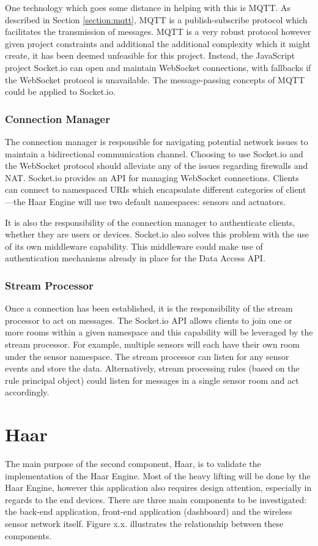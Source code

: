       One technology which goes some distance in helping with this is MQTT. As described in Section \ref{section:mqtt}, MQTT is a publish-subscribe protocol which facilitates the transmission of messages. MQTT is a very robust protocol however given project constraints and additional the additional complexity which it might create, it has been deemed unfeasible for this project. Instead, the JavaScript project Socket.io can open and maintain WebSocket connections, with fallbacks if the WebSocket protocol is unavailable. The message-passing concepts of MQTT could be applied to Socket.io.

      \subsubsection{Connection Manager}
        The connection manager is responsible for navigating potential network issues to maintain a bidirectional communication channel. Choosing to use Socket.io and the WebSocket protocol should alleviate any of the issues regarding firewalls and NAT. Socket.io provides an API for managing WebSocket connections. Clients can connect to namespaced URIs which encapsulate different categories of client---the Haar Engine will use two default namespaces: sensors and actuators.

        It is also the responsibility of the connection manager to authenticate clients, whether they are users or devices. Socket.io also solves this problem with the use of its own middleware capability. This middleware could make use of authentication mechanisms already in place for the Data Access API.

      \subsubsection{Stream Processor}
        Once a connection has been established, it is the responsibility of the stream processor to act on messages. The Socket.io API allows clients to join one or more rooms within a given namespace and this capability will be leveraged by the stream processor. For example, multiple sensors will each have their own room under the sensor namespace. The stream processor can listen for any sensor events and store the data. Alternatively, stream processing rules (based on the rule principal object) could listen for messages in a single sensor room and act accordingly.

  \section{Haar}
    The main purpose of the second component, Haar, is to validate the implementation of the Haar Engine. Most of the heavy lifting will be done by the Haar Engine, however this application also requires design attention, especially in regards to the end devices. There are three main components to be investigated: the back-end application, front-end application (dashboard) and the wireless sensor network itself. Figure x.x. illustrates the relationship between these components.

